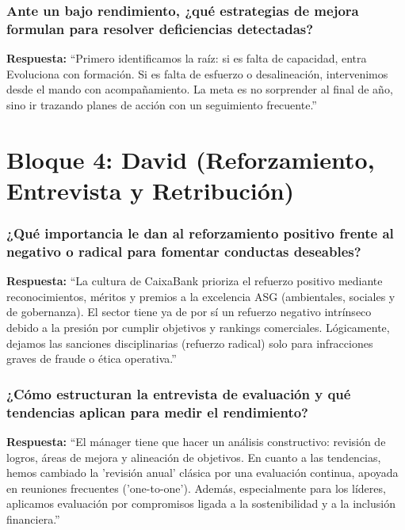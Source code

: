 \subsubsection*{Ante un bajo rendimiento, ¿qué estrategias de mejora formulan para resolver deficiencias detectadas?}

\textbf{Respuesta:}\newline
``Primero identificamos la raíz: si es falta de capacidad, entra Evoluciona con formación. Si es falta de esfuerzo o desalineación, intervenimos desde el mando con acompañamiento. La meta es no sorprender al final de año, sino ir trazando planes de acción con un seguimiento frecuente.''

\section{Bloque 4: David (Reforzamiento, Entrevista y Retribución)}

\subsubsection*{¿Qué importancia le dan al reforzamiento positivo frente al negativo o radical para fomentar conductas deseables?}

\textbf{Respuesta:}\newline
``La cultura de CaixaBank prioriza el refuerzo positivo mediante reconocimientos, méritos y premios a la excelencia ASG (ambientales, sociales y de gobernanza). El sector tiene ya de por sí un refuerzo negativo intrínseco debido a la presión por cumplir objetivos y rankings comerciales. Lógicamente, dejamos las sanciones disciplinarias (refuerzo radical) solo para infracciones graves de fraude o ética operativa.''

\subsubsection*{¿Cómo estructuran la entrevista de evaluación y qué tendencias aplican para medir el rendimiento?}

\textbf{Respuesta:}\newline
``El mánager tiene que hacer un análisis constructivo: revisión de logros, áreas de mejora y alineación de objetivos. En cuanto a las tendencias, hemos cambiado la 'revisión anual' clásica por una evaluación continua, apoyada en reuniones frecuentes ('one-to-one'). Además, especialmente para los líderes, aplicamos evaluación por compromisos ligada a la sostenibilidad y a la inclusión financiera.''

